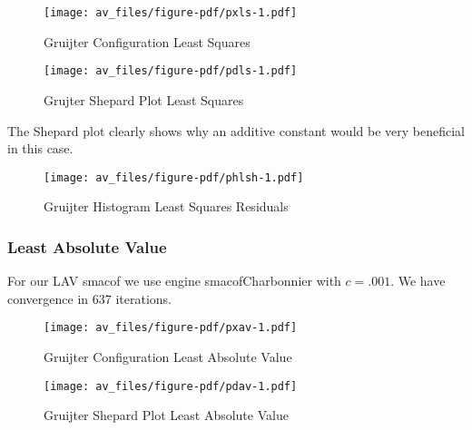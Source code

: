 \documentclass[
  12pt,
  letterpaper,
  DIV=11,
  numbers=noendperiod]{scrartcl}
\theoremstyle{plain}
\theoremstyle{plain}
\theoremstyle{plain}
\theoremstyle{definition}
\theoremstyle{remark}
\begin{document}
\begin{figure}[H]

{\centering \texttt{[image: av\_files/figure-pdf/pxls-1.pdf]}

}

\caption{Gruijter Configuration Least Squares}

\end{figure}%

\begin{figure}[H]

{\centering \texttt{[image: av\_files/figure-pdf/pdls-1.pdf]}

}

\caption{Grujter Shepard Plot Least Squares}

\end{figure}%

The Shepard plot clearly shows why an additive constant would be very
beneficial in this case.

\begin{figure}[H]

{\centering \texttt{[image: av\_files/figure-pdf/phlsh-1.pdf]}

}

\caption{Gruijter Histogram Least Squares Residuals}

\end{figure}%

\subsubsection{Least Absolute Value}\label{least-absolute-value}

For our LAV smacof we use engine smacofCharbonnier with \(c=.001\). We
have convergence in 637 iterations.

\begin{figure}[H]

{\centering \texttt{[image: av\_files/figure-pdf/pxav-1.pdf]}

}

\caption{Gruijter Configuration Least Absolute Value}

\end{figure}%

\begin{figure}[H]

{\centering \texttt{[image: av\_files/figure-pdf/pdav-1.pdf]}

}

\caption{Gruijter Shepard Plot Least Absolute Value}

\end{figure}%
\end{document}
